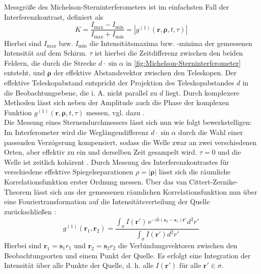 Messgröße des Michelson-Sterninterferometers ist im einfachsten Fall der Interferenzkontrast, definiert als \cite{foellmiIntensityInterferometrySecondorder2009}
\begin{equation}
    K = \frac{I_{\mathrm{max}}-I_{\mathrm{min}}}{I_{\mathrm{max}}+I_{\mathrm{min}}}=\left|g^{(1)}(\mathbf{r}, \bm{\rho}, t, \tau)\right|
\end{equation} 
Hierbei sind $I_{\mathrm{max}}$ bzw. $I_{\mathrm{min}}$ die Intensitätsmaxima bzw. -minima der gemessenen Intensität auf dem Schirm. 
$\tau$ ist hierbei die Zeitdifferenz zwischen den beiden Feldern, die durch die Strecke $d\cdot\sin \alpha$ in \autoref{fig:Michelson-Sterninterferometer} entsteht, und $\bm{\rho}$ der effektive Abstandsvektor zwischen den Teleskopen. 
Der effektive Teleskopabstand entspricht der Projektion des Teleskopabstandes $d$ in die Beobachtungsebene, die i. A. nicht parallel zu $d$ liegt. 
Durch komplexere Methoden lässt sich neben der Amplitude auch die Phase der komplexen Funktion $g^{(1)}(\mathbf{r}, \bm{\rho}, t, \tau)$ messen, vgl. dazu \cite[Kap. 4.3]{mandelOpticalCoherenceQuantum1995}. \\
Die Messung eines Sternendurchmessers lässt sich nun wie folgt bewerkstelligen:
Im Interferometer wird die Weglängendifferenz $d \cdot\sin \alpha$ durch die Wahl einer passenden Verzögerung kompensiert, sodass die Welle zwar an zwei verschiedenen Orten, aber effektiv zu ein und derselben Zeit gesampelt wird. 
$\tau=0$ und die Welle ist zeitlich kohärent \cite{foellmiIntensityInterferometrySecondorder2009}. 
Durch Messung des Interferenzkontrastes für verschiedene effektive Spiegelseparationen $\rho=|\bm{\rho}|$ lässt sich die räumliche Korrelationsfunktion erster Ordnung messen. 
Über das van Cittert-Zernike-Theorem lässt sich aus der gemessenen räumlichen Korrelationsfunktion nun über eine Fouriertransformation auf die Intensitätsverteilung der Quelle zurückschließen \cite[eq. 4.4-40]{mandelOpticalCoherenceQuantum1995}:
\begin{equation}
    g^{(1)}(\bm{r}_1, \bm{r}_2) = \frac{\int_\sigma I(\bm{r}') \,\mathrm{e}^{-i\overline{k}\left(\bm{s}_2 - \bm{s}_1\right) \bm{r}'} d^2r'}{\int_\sigma I \left(\bm{r}'\right) d^2 r'}
    \label{eq:van Cittert-Zernike}
\end{equation}
Hierbei sind $\bm{r}_1=\bm{s}_1 r_1$ und $\bm{r}_2=\bm{s}_2 r_2$ die Verbindungsvektoren zwischen den Beobachtungsorten und einem Punkt der Quelle. 
Es erfolgt eine Integration der Intensität über alle Punkte der Quelle, d. h. alle $I\left(\bm{r}'\right)$ für alle $\bm{r}'\in \sigma$. 
